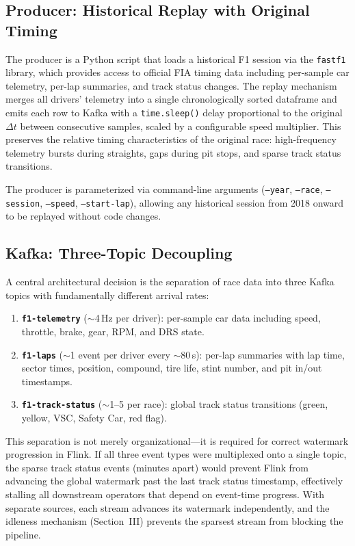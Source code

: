 \documentclass[a4paper,twocolumn]{article}
\begin{document}
\subsection{Producer: Historical Replay with Original Timing}

The producer is a Python script that loads a historical F1 session via the
\texttt{fastf1} library, which provides access to official FIA timing data
including per-sample car telemetry, per-lap summaries, and track status
changes. The replay mechanism merges all drivers' telemetry into a single
chronologically sorted dataframe and emits each row to Kafka with a
\texttt{time.sleep()} delay proportional to the original $\Delta t$
between consecutive samples, scaled by a configurable speed multiplier.
This preserves the relative timing characteristics of the original race:
high-frequency telemetry bursts during straights, gaps during pit stops,
and sparse track status transitions.

The producer is parameterized via command-line arguments (\texttt{--year},
\texttt{--race}, \texttt{--session}, \texttt{--speed},
\texttt{--start-lap}), allowing any historical session from 2018 onward to
be replayed without code changes.

\subsection{Kafka: Three-Topic Decoupling}

A central architectural decision is the separation of race data into three
Kafka topics with fundamentally different arrival rates:

\begin{enumerate}
  \item \textbf{\texttt{f1-telemetry}} ($\sim$4\,Hz per driver):
    per-sample car data including speed, throttle, brake, gear, RPM, and
    DRS state.
  \item \textbf{\texttt{f1-laps}} ($\sim$1 event per driver every
    $\sim$80\,s): per-lap summaries with lap time, sector times, position,
    compound, tire life, stint number, and pit in/out timestamps.
  \item \textbf{\texttt{f1-track-status}} ($\sim$1--5 per race): global
    track status transitions (green, yellow, VSC, Safety Car, red flag).
\end{enumerate}

This separation is not merely organizational---it is required for correct
watermark progression in Flink. If all three event types were multiplexed
onto a single topic, the sparse track status events (minutes apart) would
prevent Flink from advancing the global watermark past the last track
status timestamp, effectively stalling all downstream operators that depend
on event-time progress. With separate sources, each stream advances its
watermark independently, and the idleness mechanism (Section~III)
prevents the sparsest stream from blocking the pipeline.
\end{document}
